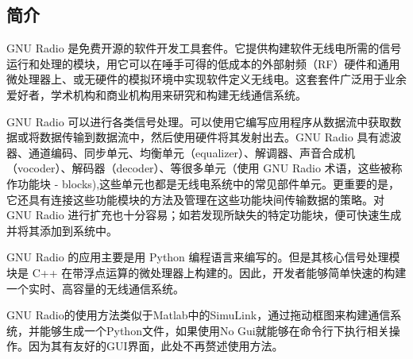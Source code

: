 		\subsection{简介}
			\par GNU Radio 是免费开源的软件开发工具套件。它提供构建软件无线电所需的信号运行和处理的模块，用它可以在唾手可得的低成本的外部射频（RF）硬件和通用微处理器上、或无硬件的模拟环境中实现软件定义无线电。这套套件广泛用于业余爱好者，学术机构和商业机构用来研究和构建无线通信系统。
			\par GNU Radio 可以进行各类信号处理。可以使用它编写应用程序从数据流中获取数据或将数据传输到数据流中，然后使用硬件将其发射出去。GNU Radio 具有滤波器、通道编码、同步单元、均衡单元（equalizer）、解调器、声音合成机（vocoder）、解码器（decoder）、等很多单元（使用 GNU Radio 术语，这些被称作功能块 - blocks),这些单元也都是无线电系统中的常见部件单元。更重要的是，它还具有连接这些功能模块的方法及管理在这些功能块间传输数据的策略。对 GNU Radio 进行扩充也十分容易；如若发现所缺失的特定功能块，便可快速生成并将其添加到系统中。
			\par GNU Radio 的应用主要是用 Python 编程语言来编写的。但是其核心信号处理模块是 C++ 在带浮点运算的微处理器上构建的。因此，开发者能够简单快速的构建一个实时、高容量的无线通信系统。\cite{what_is_gnuradio}
			\par GNU Radio的使用方法类似于Matlab中的SimuLink，通过拖动框图来构建通信系统，并能够生成一个Python文件，如果使用No Gui就能够在命令行下执行相关操作。因为其有友好的GUI界面，此处不再赘述使用方法。
